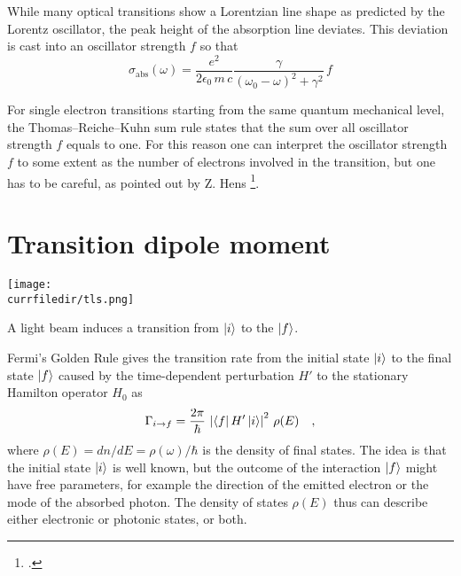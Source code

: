 While many optical transitions show a Lorentzian line shape as predicted by the Lorentz oscillator, the peak height of the absorption line deviates. This deviation is cast into an oscillator strength $f$ so that 
\[
 \sigma_{\text{abs}}(\omega) =   \frac{e^2  }{2 \epsilon_0 \,  m \, c}  \frac{\gamma  }{(\omega_0 - \omega)^2 +  \gamma ^2}  \, f
\]

For single electron transitions starting from the same quantum mechanical level, the Thomas–Reiche–Kuhn sum rule states that the sum over all oscillator strength $f$ equals to one. For this reason one can interpret the oscillator strength  $f$  to some extent  as the number of electrons involved in  the transition, but one has to be careful, as pointed out by Z. Hens \footcite{Hens:2008kr}.




\section{Transition dipole moment}

\begin{marginfigure}
\texttt{[image: \\currfiledir/tls.png]}
\caption{A light beam induces a transition from $\ket{i}$ to the  $\ket{f}$.}
\end{marginfigure}

Fermi's Golden Rule gives the transition rate from the initial state $\ket{i}$ to the final state $\ket{f}$ caused by the time-dependent perturbation $H'$ to the stationary Hamilton operator $H_0$ as
\[
 \Gamma_{i \rightarrow f} = \frac{2 \pi}{\hbar} \, \left| \bra{f} H' \ket{i} \right|^2 \, \rho(E) \quad ,
\]
where  $\rho(E) = d n / d E = \rho(\omega) / \hbar$ is the density of final states. The idea is that the initial state  $\ket{i}$ is well known, but the outcome of the interaction $\ket{f}$ might have free parameters, for example the direction of the emitted electron or the mode of the absorbed photon. The density of states   $\rho(E)$ thus can describe either electronic or photonic states, or both.




